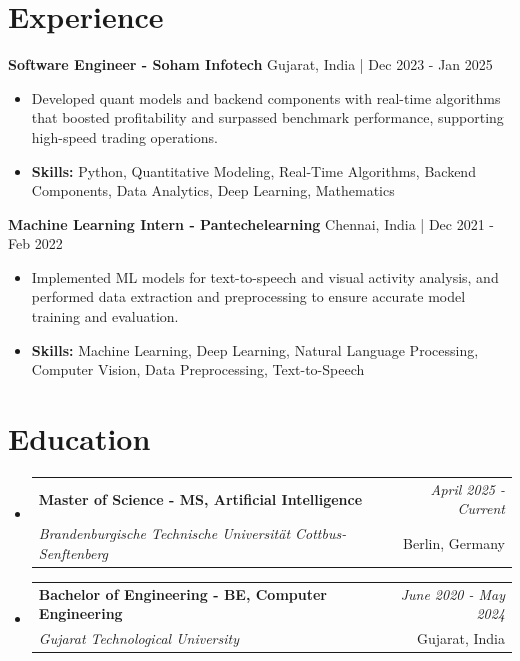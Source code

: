 \documentclass[a4paper,11pt]{article}
\makeatletter
\newcommand{\resumeSubheading}[4]{
\vspace{0.5mm}\item
    \begin{tabular*}{\linewidth}[t]{l@{\extracolsep{\fill}}r}
        \textbf{#1} & \textit{\footnotesize{#4}} \\
        \textit{\footnotesize{#3}} &  \footnotesize{#2}\\
    \end{tabular*}
    \vspace{-2.4mm}
}
\makeatother
\begin{document}
\section{\textbf{Experience}}


\vspace{1mm}
  \textbf{Software Engineer - Soham Infotech} \hfill Gujarat, India | Dec 2023 - Jan 2025
\vspace{-1.5mm} %
\begin{itemize}
  \item Developed quant models and backend components with real-time algorithms that boosted profitability and surpassed benchmark performance, supporting high-speed trading operations.

\vspace{-2mm}
  \item \textbf{Skills:} Python, Quantitative Modeling, Real-Time Algorithms, Backend Components, Data Analytics, Deep Learning, Mathematics
\end{itemize}

\vspace{1mm}
  \textbf{Machine Learning Intern - Pantechelearning} \hfill Chennai, India | Dec 2021 - Feb 2022
\vspace{-1.5mm} %
\begin{itemize}
  \item Implemented ML models for text-to-speech and visual activity analysis, and performed data extraction and preprocessing to ensure accurate model training and evaluation.
\vspace{-2mm}
  \item \textbf{Skills:} Machine Learning, Deep Learning, Natural Language Processing, Computer Vision, Data Preprocessing, Text-to-Speech
\end{itemize}\section{\textbf{Education}}
\vspace{-0.4mm}

\begin{itemize}[leftmargin=0.15in, label={}]
\resumeSubheading
{Master of Science - MS, Artificial Intelligence }{Berlin, Germany}
{Brandenburgische Technische Universität Cottbus-Senftenberg  }{April 2025 - Current}

\vspace{1.0mm} %
\resumeSubheading
{Bachelor of Engineering - BE, Computer Engineering  }{Gujarat, India}
{Gujarat Technological University }{June 2020 - May 2024}

\end{itemize}
\end{document}
